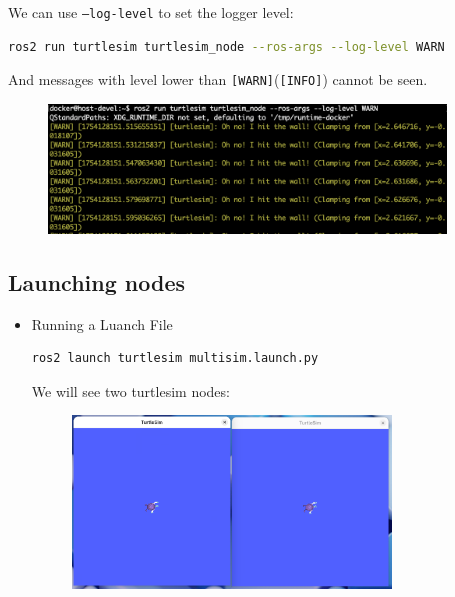 \documentclass[12pt, a4paper]{article}
\begin{document}
\begin{enumerate}
\newpage
We can use \texttt{--log-level} to set the logger level:
\begin{lstlisting}[language=bash]
ros2 run turtlesim turtlesim_node --ros-args --log-level WARN
\end{lstlisting}
And messages with level lower than \texttt{[WARN]}(\texttt{[INFO]}) cannot be seen.
\begin{figure}[h]
	\setlength{\leftskip}{2.4em}
	\includegraphics[width=0.94\textwidth]{p1.8-3}
\end{figure}
\end{enumerate}

\newpage
\subsection{Launching nodes}
\begin{itemize}
	\item Running a Luanch File
\begin{lstlisting}[language=bash]
ros2 launch turtlesim multisim.launch.py
\end{lstlisting}
We will see two turtlesim nodes:
\begin{figure}[h]
	\centering
	\includegraphics[width=0.8\textwidth]{p1.9-1}
\end{figure}
\end{itemize}

\newpage
\end{document}
